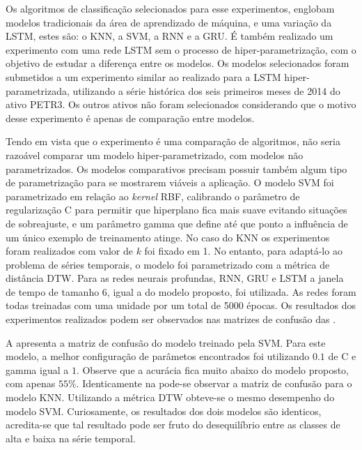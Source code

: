 Os algoritmos de classificação selecionados para esse experimentos, englobam modelos tradicionais da área de aprendizado de máquina, e uma variação da \acrshort{LSTM}, estes são: o \acrshort{KNN}, a \acrshort{SVM}, a \acrshort{RNN} e a \acrshort{GRU}. É também realizado um experimento com uma rede \acrshort{LSTM} sem o processo de hiper-parametrização, com o objetivo de estudar a diferença entre os modelos. Os modelos selecionados foram submetidos a um experimento similar ao realizado para a \acrshort{LSTM} hiper-parametrizada, utilizando a série histórica dos seis primeiros meses de 2014 do ativo PETR3. Os outros ativos não foram selecionados considerando que o motivo desse experimento é apenas de comparação entre modelos. 

Tendo em vista que o experimento é uma comparação de algoritmos, não seria razoável comparar um modelo hiper-parametrizado, com modelos não parametrizados. Os modelos comparativos precisam possuir também algum tipo de parametrização para se mostrarem viáveis a aplicação. O modelo \acrshort{SVM} foi parametrizado em relação ao \emph{kernel} RBF, calibrando o parâmetro de regularização C para permitir que hiperplano fica mais suave evitando situações de sobreajuste, e um parâmetro gamma que define até que ponto a influência de um único exemplo de treinamento atinge. No caso do \acrshort{KNN} os experimentos foram realizados com valor de $k$ foi fixado em 1. No entanto, para adaptá-lo ao problema de séries temporais, o modelo foi parametrizado com a métrica de distância \acrfull{DTW}. Para as redes neurais profundas, \acrshort{RNN}, \acrshort{GRU} e \acrshort{LSTM} a janela de tempo de tamanho $6$, igual a do modelo proposto, foi utilizada. As redes foram todas treinadas com uma unidade por um total de 5000 épocas. Os resultados dos experimentos realizados podem ser observados nas matrizes de confusão das . 

A  apresenta a matriz de confusão do modelo treinado pela \acrshort{SVM}. Para este modelo, a melhor configuração de parâmetos encontrados foi utilizando $0.1$ de C e gamma igual a $1$. Observe que a acurácia fica muito abaixo do modelo proposto, com apenas $55\%$. Identicamente na  pode-se observar a matriz de confusão para o modelo \acrshort{KNN}. Utilizando a métrica \acrshort{DTW} obteve-se o mesmo desempenho do modelo \acrshort{SVM}. Curiosamente, os resultados dos dois modelos são identicos, acredita-se que tal resultado pode ser fruto do desequilíbrio entre as classes de alta e baixa na série temporal.

